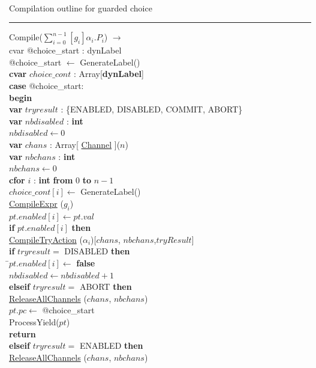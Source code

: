 \documentclass[a4paper,11pt]{article}
\newenvironment{program}{
  \begin{sffamily}
  \begin{scriptsize}
  \begin{tabbing}}
 {\end{tabbing}
  \end{scriptsize}
  \end{sffamily}}
\newcommand{\kw}[1]{\textsf{\textbf{#1}}}
\newcommand{\pindent}{\hspace{2em}\=}
\newcommand{\compiletime}[1]{\textcolor{compilecolor}{#1}}
\newcommand{\synchro}[1]{\textcolor{synchrocolor}{#1}}
\newcommand{\algotitle}[1]{\noindent\\ \noindent#1\par\nobreak\vspace{3pt}\hrule\vspace{6pt}}
\newcommand{\algosection}[1]{
  \phantomsection
  \algotitle{#1}
}
\newcommand{\myref}[1]{
  \hyperref[#1]{#1}
}
\begin{document}
\algosection{Compilation outline for guarded choice}
\begin{program}
  \compiletime{Compile($\sum_{i=0}^{n-1}[g_i]\alpha_i.P_i$) $\rightarrow$} \\
  \compiletime{cvar @choice\_start : dynLabel} \\
  \compiletime{@choice\_start $\leftarrow$ GenerateLabel()} \\
  \compiletime{\kw{cvar} $choice\_cont$ : Array[\kw{dynLabel}]} \\
  \kw{case} @choice\_start: \\
  \kw{begin} \\ 
  \pindent\kw{var} $tryresult$ : \{ENABLED, DISABLED, COMMIT, ABORT\} \\
  \>\kw{var} $nbdisabled$ : \kw{int} \\
  \>$nbdisabled \leftarrow 0$ \\
  \>\kw{var} $chans$ : Array[\myref{Channel}]($n$) \\
  \>\kw{var} $nbchans$ : \kw{int} \\
  \>$nbchans \leftarrow 0$ \\
  \>\compiletime{\kw{cfor} $i$ : \kw{int} \kw{from} $0$ \kw{to} $n-1$} \\
  \>\pindent\compiletime{$choice\_cont[i] \leftarrow$ GenerateLabel()} \\
  \>\>\compiletime{\myref{CompileExpr}($g_i$)} \\
  \>\>$pt.enabled[i] \leftarrow pt.val$ \\
  \>\>\kw{if} $pt.enabled[i]$ \kw{then} \\
  \>\>\pindent\compiletime{\myref{CompileTryAction}($\alpha_i$)}[$chans$, $nbchans$,$tryResult$] \\
  \>\>\>\kw{if} $tryresult =$ DISABLED \kw{then} \\
  \>\>\>\pindent$pt.enabled[i] \leftarrow$ \kw{false} \\
  \>\>\>\>$nbdisabled \leftarrow nbdisabled + 1$ \\
  \>\>\>\kw{elseif} $tryresult =$ ABORT \kw{then} \\
  \>\>\>\>\synchro{\myref{ReleaseAllChannels}($chans$, $nbchans$)} \\
  \>\>\>\> $pt.pc \leftarrow$ @choice\_start \\
  \>\>\>\> ProcessYield($pt$) \\
  \>\>\>\> \kw{return} \\
  \>\>\>\kw{elseif} $tryresult =$ ENABLED \kw{then} \\
  \>\>\>\pindent\synchro{\myref{ReleaseAllChannels}($chans$, $nbchans$)} \\

\end{program}
\end{document}
